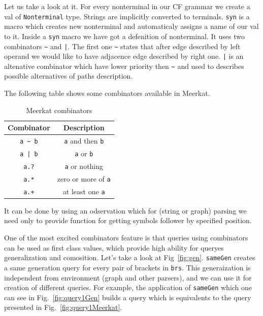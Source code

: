 Let us take a look at it.
For every nonterminal in our CF grammar we create a val of  \lstinline{Nonterminal} type.
Strings are implicitly converted to terminals.
\lstinline{syn} is a macro which creates new nonterminal and automaticaly assigns a name of our val to it.
Inside a \lstinline{syn} macro we have got a defenition of nonterminal.
It uses two combinators \lstinline{~} and \lstinline{|}.
The first one \lstinline{~}  states that after edge described by left operand we would like to have adjacence edge described by right one.
\lstinline{|} is an altenative combinator which have lower priority then \lstinline{~} and used to describes possible alternatives of paths description.

The following table shows some combinators available in Meerkat. 

\begin{table}[h]
\centering
\begin{tabular}{|c|c|}
\hline
\multicolumn{1}{|c|}{Combinator} & \multicolumn{1}{c|}{Description} \\ \hline
{\lstinline!a ~ b!} & {\lstinline!a!} and then {\lstinline!b!}   \\
{\lstinline!a | b!} & {\lstinline!a!} or {\lstinline!b!}         \\
{\lstinline!a.?!}   & {\lstinline!a!} or nothing   \\
{\lstinline!a.*!}   & zero or more of {\lstinline!a!} \\
{\lstinline!a.+!}   & at least one {\lstinline!a!} \\
\hline
\end{tabular}
\caption{Meerkat combinators}
\label{table:combinators}
\end{table}


It can be done by using an odservation which for (string or graph) parsing we need only to provide function for getting symbols follower by specified position.


One of the most excited combinators feature is that queries using combinators can be used as first class values, which provide high ability for queryes generalization and comosition.
Let's take a look at Fig~\ref{fig:gen}. \lstinline{sameGen} creates a same generation query for every pair of brackets in \lstinline{brs}.
This generaization is independent from environment (graph and other parsers), and we can use it for creation of different queries.
For example, the application of \lstinline{sameGen} which one can see in Fig.~\ref{fig:query1Gen} builds a query which is equivalents to the query presented in Fig.~\ref{fig:query1Meerkat}.

